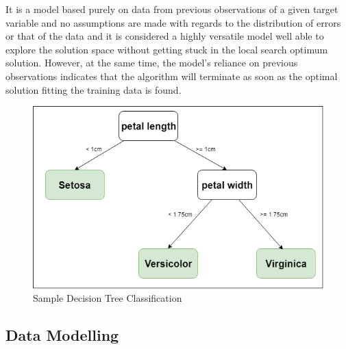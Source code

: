 It is a model based purely on data from previous observations of a given target variable and no assumptions are made with regards to the distribution of errors or that of the data and it is considered a highly versatile model\cite{ensembleMethodsInMachineLearningDietterich} well able to explore the solution space without getting stuck in the local search optimum solution\cite{ensembleMethodsInMachineLearningDietterich}. However, at the same time, the model's reliance on previous observations indicates that the algorithm will terminate as soon as the optimal solution fitting the training data is found.

\begin{figure}[!h]
    \centering
    \includegraphics[scale=0.6]{Figures/decision_tree_sample.png}
    \caption{Sample Decision Tree Classification}
    \label{fig:decision-tree-sample}
\end{figure}



\subsection{Data Modelling}

